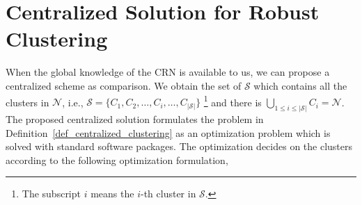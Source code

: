 \documentclass[times]{ettauth}
\newcommand{\ie}{i.e., }
\theoremstyle{mytheoremstyle}
\theoremstyle{mytheoremstyle}
\theoremstyle{mytheoremstyle}
\begin{document}





\section{Centralized Solution for Robust Clustering}
\label{centralized_solution}
When the global knowledge of the CRN is available to us, we can propose a centralized scheme as comparison.
We obtain the set of $\mathcal{S}$ which contains all the clusters in $\mathcal{N}$, \ie $\mathcal{S}=\{C_1, C_2,\ldots,C_i, \ldots, C_{|\mathcal{S}|}\}$ \footnote{The subscript $i$ means the $i$-th cluster in $\mathcal{S}$.} and there is $\bigcup_{1\leq i \leq |\mathcal{S}|} C_i = \mathcal{N}$.
The proposed centralized solution formulates the problem in Definition~\ref{def_centralized_clustering} as an optimization problem which is solved with standard software packages.
The optimization decides on the clusters according to the following optimization formulation,
%
%
\end{document}
